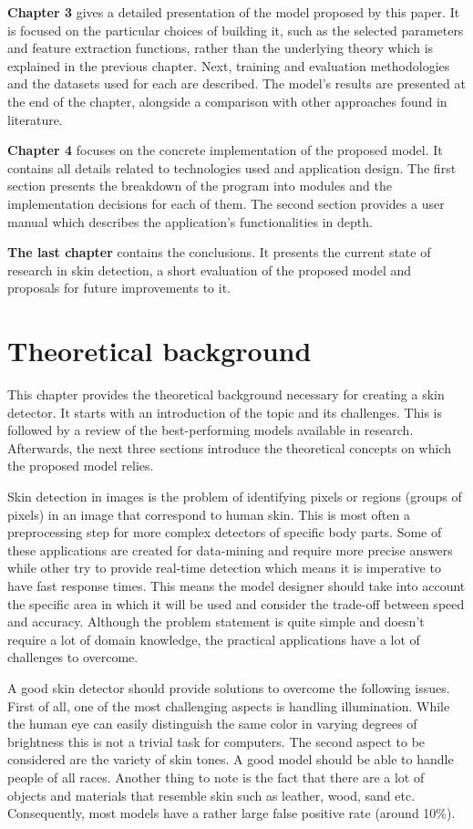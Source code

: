 \documentclass[12pt]{report}
\begin{document}
	\textbf{Chapter 3} gives a detailed presentation of the model proposed by this paper. It is focused on the particular choices of building it, such as the selected parameters and feature extraction functions, rather than the underlying theory which is explained in the previous chapter. Next, training and evaluation methodologies and the datasets used for each are described. The model's results are presented at the end of the chapter, alongside a comparison with other approaches found in literature.
	
	\textbf{Chapter 4} focuses on the concrete implementation of the proposed model. It contains all details related to technologies used and application design. The first section presents the breakdown of the program into modules and the implementation decisions for each of them. The second section provides a user manual which describes the application's functionalities in depth.
	
	\textbf{The last chapter} contains the conclusions. It presents the current state of research in skin detection, a short evaluation of the proposed model and proposals for future improvements to it.
	
	\chapter{Theoretical background}
	This chapter provides the theoretical background necessary for creating a skin detector. It starts with an introduction of the topic and its challenges. This is followed by a review of the best-performing models available in research. Afterwards, the next three sections introduce the theoretical concepts on which the proposed model relies.
	
	Skin detection in images is the problem of identifying pixels or regions (groups of pixels) in an image that correspond to human skin. This is most often a preprocessing step for more complex detectors of specific body parts. Some of these applications are created for data-mining and require more precise answers while other try to provide real-time detection which means it is imperative to have fast response times. This means the model designer should take into account the specific area in which it will be used and consider the trade-off between speed and accuracy. Although the problem statement is quite simple and doesn't require a lot of domain knowledge, the practical applications have a lot of challenges to overcome.
	
	A good skin detector should provide solutions to overcome the following issues. First of all, one of the most challenging aspects is handling illumination. While the human eye can easily distinguish the same color in varying degrees of brightness this is not a trivial task for computers. The second aspect to be considered are the variety of skin tones. A good model should be able to handle people of all races. Another thing to note is the fact that there are a lot of objects and materials that resemble skin such as leather, wood, sand etc. Consequently, most models have a rather large false positive rate (around 10\%).
	
\end{document}
